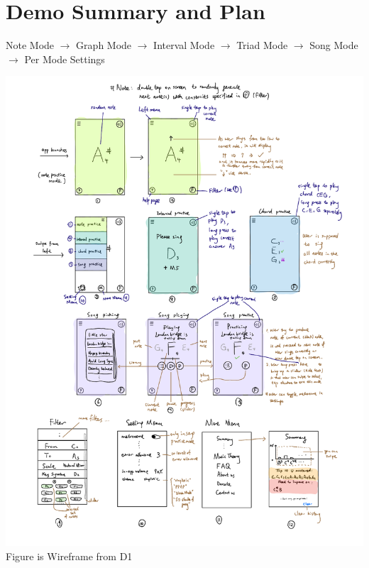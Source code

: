 \documentclass{article}
\begin{document}
\section{ Demo Summary and Plan  } 
    Note Mode $\to$ Graph Mode $\to$ Interval Mode $\to$ Triad Mode $\to$ Song Mode $\to$ Per Mode Settings 

\includegraphics[page=1,width=.6\textwidth] {wireframes.pdf} Figure is Wireframe from D1
\end{document}
